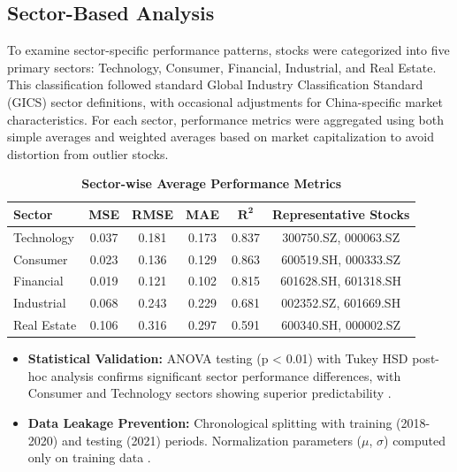 \documentclass[3p,times,procedia]{elsarticle}
\begin{document}
\subsection{Sector-Based Analysis}
\vspace{-2pt}
To examine sector-specific performance patterns, stocks were categorized into five primary sectors: Technology, Consumer, Financial, Industrial, and Real Estate. This classification followed standard Global Industry Classification Standard (GICS) sector definitions, with occasional adjustments for China-specific market characteristics. For each sector, performance metrics were aggregated using both simple averages and weighted averages based on market capitalization to avoid distortion from outlier stocks.

\begin{table}[!ht]\footnotesize
\centering
\caption{\textbf{Sector-wise Average Performance Metrics}}
\begin{tabular}{|l|c|c|c|c|c|}
\hline
\textbf{Sector} & \textbf{MSE} & \textbf{RMSE} & \textbf{MAE} & \textbf{$\mathbf{R^2}$} & \textbf{Representative Stocks} \\
\hline
Technology & 0.037 & 0.181 & 0.173 & 0.837 & 300750.SZ, 000063.SZ \\
Consumer & 0.023 & 0.136 & 0.129 & 0.863 & 600519.SH, 000333.SZ \\
Financial & 0.019 & 0.121 & 0.102 & 0.815 & 601628.SH, 601318.SH \\
Industrial & 0.068 & 0.243 & 0.229 & 0.681 & 002352.SZ, 601669.SH \\
Real Estate & 0.106 & 0.316 & 0.297 & 0.591 & 600340.SH, 000002.SZ \\
\hline
\end{tabular}
\end{table}

\begin{itemize}\setlength{\itemsep}{1pt}
\item \textbf{Statistical Validation:} ANOVA testing (p < 0.01) with Tukey HSD post-hoc analysis confirms significant sector performance differences, with Consumer and Technology sectors showing superior predictability \cite{Box1970,Tukey1949}.

\item \textbf{Data Leakage Prevention:} Chronological splitting with training (2018-2020) and testing (2021) periods. Normalization parameters ($\mu$, $\sigma$) computed only on training data \cite{Fischer2018}.
\end{itemize}
\end{document}
